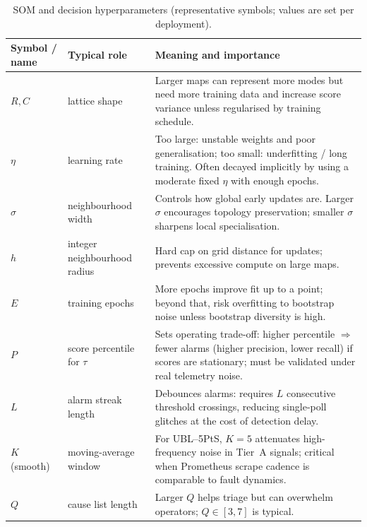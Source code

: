 \documentclass[sigconf]{acmart}
\begin{document}
\begin{table}[t]
\begingroup
\footnotesize
\renewcommand{\arraystretch}{1.05}
\setlength{\tabcolsep}{5pt}
\centering
\caption{SOM and decision hyperparameters (representative symbols; values are set per deployment).}
\label{tab:som-hyper}
\begin{tabularx}{\textwidth}{@{}>{\raggedright\arraybackslash}p{2.4cm}>{\raggedright\arraybackslash}p{1.6cm}>{\raggedright\arraybackslash}X@{}}
\toprule
\textbf{Symbol / name} & \textbf{Typical role} & \textbf{Meaning and importance} \\
\midrule
$R,C$ & lattice shape & Larger maps can represent more modes but need more training data and increase score variance unless regularised by training schedule. \\
$\eta$ & learning rate & Too large: unstable weights and poor generalisation; too small: underfitting / long training. Often decayed implicitly by using a moderate fixed $\eta$ with enough epochs. \\
$\sigma$ & neighbourhood width & Controls how global early updates are. Larger $\sigma$ encourages topology preservation; smaller $\sigma$ sharpens local specialisation. \\
$h$ & integer neighbourhood radius & Hard cap on grid distance for updates; prevents excessive compute on large maps. \\
$E$ & training epochs & More epochs improve fit up to a point; beyond that, risk overfitting to bootstrap noise unless bootstrap diversity is high. \\
$P$ & score percentile for $\tau$ & Sets operating trade-off: higher percentile $\Rightarrow$ fewer alarms (higher precision, lower recall) if scores are stationary; must be validated under real telemetry noise. \\
$L$ & alarm streak length & Debounces alarms: requires $L$ consecutive threshold crossings, reducing single-poll glitches at the cost of detection delay. \\
$K$ (smooth) & moving-average window & For UBL--5PtS, $K{=}5$ attenuates high-frequency noise in Tier~A signals; critical when Prometheus scrape cadence is comparable to fault dynamics. \\
$Q$ & cause list length & Larger $Q$ helps triage but can overwhelm operators; $Q{\in}[3,7]$ is typical. \\
\bottomrule
\end{tabularx}
\renewcommand{\arraystretch}{1}
\endgroup
\end{table}
\end{document}
